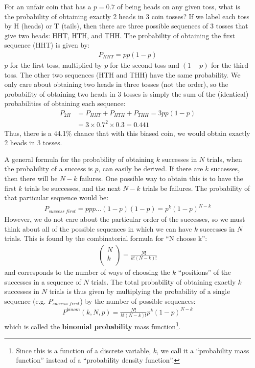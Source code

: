 \begin{example}{For an unfair coin that has a $p=0.7$ of being heads on any given toss, what is the probability of obtaining exactly 2 heads in 3 coin tosses?}
If we label each toss by H (heads) or T (tails), then there are three possible sequences of 3 tosses that give two heads: HHT, HTH, and THH. The probability of obtaining the first sequence (HHT) is given by:
\begin{align*}
P_{HHT}=pp(1-p)
\end{align*} 
$p$ for the first toss, multiplied by $p$ for the second toss and $(1-p)$ for the third toss. The other two sequences (HTH and THH) have the same probability. We only care about obtaining two heads in three tosses (not the order), so the probability of obtaining two heads in 3 tosses is simply the sum of the (identical) probabilities of obtaining each sequence:
\begin{align*}
P_{2H}&=P_{HHT}+P_{HTH}+P_{THH}=3pp(1-p)\\
&=3\times0.7^2\times0.3=0.441
\end{align*}
Thus, there is a 44.1\% chance that with this biased coin, we would obtain exactly 2 heads in 3 tosses.
\end{example}

A general formula for the probability of obtaining $k$ successes in $N$ trials, when the probability of a success is $p$, can easily be derived.  If there are $k$ successes, then there will be $N-k$ failures. One possible way to obtain this is to have the first $k$ trials be successes, and the next $N-k$ trials be failures. The probability of that particular sequence would be:
\begin{align*}
P_{success\: first}=ppp\dots(1-p)(1-p)=p^k(1-p)^{N-k}
\end{align*}
However, we do not care about the particular order of the successes, so we must think about all of the possible sequences in which we can have $k$ successes in $N$ trials. This is found by the combinatorial formula for ``N choose k'':
\begin{align*}
\left(
\begin{array}{c}
N\\
k\\
\end{array}
\right)=\frac{N!}{k!(N-k)!}
\end{align*}
and corresponds to the number of ways of choosing the $k$ ``positions'' of the successes in a sequence of $N$ trials. The total probability of obtaining exactly $k$ successes in $N$ trials is thus given by multiplying the probability of a single sequence (e.g. $P_{success\: first}$) by the number of possible sequences:
\begin{align}
\label{eqn:binomialP}
P^{binom}(k,N,p)=\frac{N!}{k!(N-k)!}p^k(1-p)^{N-k}
\end{align}
which is called the \textbf{binomial probability} mass function\footnote{Since this is a function of a discrete variable, $k$, we call it a ``probability mass function'' instead of a ``probability density function''.}.

